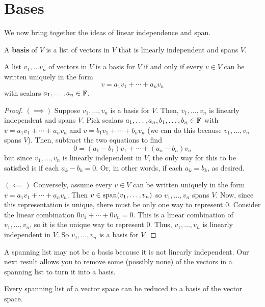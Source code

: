 \section{Bases}
We now bring together the ideas of linear independence and span.
\begin{definition}[Basis]
    A \textbf{basis} of $V$ is a list of vectors in $V$ that is linearly independent and spans $V$.
\end{definition}
\begin{theorem}
    A list $v_1,\dots v_n$ of vectors in $V$ is a basis for $V$ if and only if every $v\in V$ can be written uniquely in the form
    \[ v = a_1v_1 + \cdots + a_nv_n\]
    with scalars $a_1, \dots, a_n\in \mathbb F$.
\end{theorem}
\begin{proof}
    $(\implies)$ Suppose $v_1,\dots, v_n$ is a basis for $V$. Then, $v_1, \dots, v_n$ is linearly independent and spans $V$. Pick scalars $a_1, \dots, a_n, b_1, \dots, b_n \in \mathbb F$ with $v = a_1v_1 + \cdots + a_nv_n$ and $v = b_1v_1 + \cdots + b_nv_n$ (we can do this because $v_1, \dots, v_n$ spans $V$). Then, subtract the two equations to find
    \[ 0 = (a_1-b_1)v_1 + \cdots + (a_n-b_n)v_n\]
    but since $v_1, \dots, v_n$ is linearly independent in $V$, the only way for this to be satisfied is if each $a_k-b_k=0$. Or, in other words, if each $a_k = b_k$, as desired.

    $(\impliedby)$ Conversely, assume every $v\in V$ can be written uniquely in the form $v = a_1v_1 + \cdots + a_nv_n$. Then $v\in\operatorname{span}(v_1, \dots, v_n)$ so $v_1, \dots, v_n$ spans $V$. Now, since this representation is unique, there must be only one way to represent $0$. Consider the linear combination $0v_1 + \cdots + 0v_n = 0$. This is a linear combination of $v_1, \dots, v_n$, so it is the unique way to represent $0$. Thus, $v_1, \dots, v_n$ is linearly independent in $V$. So $v_1, \dots, v_n$ is a basis for $V$.
\end{proof}
A spanning list may not be a basis because it is not linearly independent. Our next result allows you to remove some (possibly none) of the vectors in a spanning list to turn it into a basis. 
\begin{theorem}
    Every spanning list of a vector space can be reduced to a basis of the vector space.
\end{theorem}
